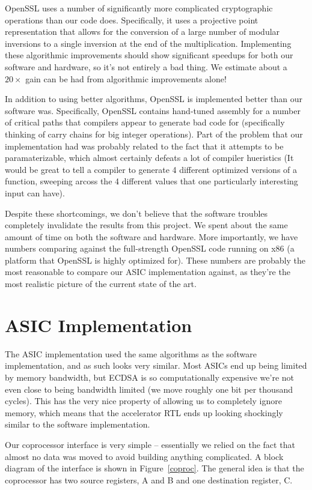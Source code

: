 \documentclass[twocolumn]{article}
\begin{document}
OpenSSL uses a number of significantly more complicated cryptographic
operations than our code does.  Specifically, it uses a projective
point representation that allows for the conversion of a large number
of modular inversions to a single inversion at the end of the
multiplication.  Implementing these algorithmic improvements should
show significant speedups for both our software and hardware, so it's
not entirely a bad thing.  We estimate about a $20\times$ gain can be
had from algorithmic improvements alone!

In addition to using better algorithms, OpenSSL is implemented better
than our software was.  Specifically, OpenSSL contains hand-tuned
assembly for a number of critical paths that compilers appear to
generate bad code for (specifically thinking of carry chains for
big integer operations).  Part of the problem that our implementation
had was probably related to the fact that it attempts to be
paramaterizable, which almost certainly defeats a lot of compiler
hueristics (It would be great to tell a compiler to generate 4 different
optimized versions of a function, sweeping arcoss the 4 different
values that one particularly interesting input can have).

Despite these shortcomings, we don't believe that the software troubles
completely invalidate the results from this project.  We spent about
the same amount of time on both the software and hardware. 
More importantly, we have numbers comparing
against the full-strength OpenSSL code running on x86 (a platform that
OpenSSL is highly optimized for\cite{kasper-openssl_ecc}).  These
numbers are probably the most reasonable to compare our ASIC
implementation against, as they're the most realistic picture of the
current state of the art.

\section{ASIC Implementation}

The ASIC implementation used the same algorithms as the software
implementation, and as such looks very similar.  Most ASICs end up
being limited by memory bandwidth, but ECDSA is so computationally
expensive we're not even close to being bandwidth limited (we move
roughly one bit per thousand cycles).  This has the very nice property
of allowing us to completely ignore memory, which means that the
accelerator RTL ends up looking shockingly similar to the software
implementation.

Our coprocessor interface is very simple -- essentially we relied on
the fact that almost no data was moved to avoid building anything
complicated.  A block diagram of the interface is shown in
Figure~\ref{coproc}.  The general idea is that the coprocessor has two
source registers, A and B and one destination register, C.
\end{document}
